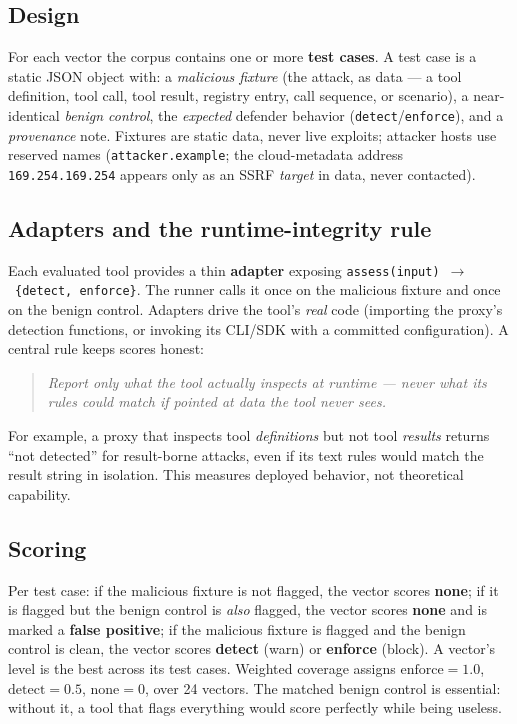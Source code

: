\documentclass[11pt]{article}
\newcommand{\code}[1]{\texttt{\small #1}}
\begin{document}
\subsection{Design}
For each vector the corpus contains one or more \textbf{test cases}. A test case is a static JSON object with: a \emph{malicious fixture} (the attack, as data --- a tool definition, tool call, tool result, registry entry, call sequence, or scenario), a near-identical \emph{benign control}, the \emph{expected} defender behavior (\code{detect}/\code{enforce}), and a \emph{provenance} note. Fixtures are static data, never live exploits; attacker hosts use reserved names (\code{attacker.example}; the cloud-metadata address \code{169.254.169.254} appears only as an SSRF \emph{target} in data, never contacted).

\subsection{Adapters and the runtime-integrity rule}
Each evaluated tool provides a thin \textbf{adapter} exposing \code{assess(input)}~$\rightarrow$~\code{\{detect, enforce\}}. The runner calls it once on the malicious fixture and once on the benign control. Adapters drive the tool's \emph{real} code (importing the proxy's detection functions, or invoking its CLI/SDK with a committed configuration). A central rule keeps scores honest:
\begin{quote}
\emph{Report only what the tool actually inspects at runtime --- never what its rules could match if pointed at data the tool never sees.}
\end{quote}
For example, a proxy that inspects tool \emph{definitions} but not tool \emph{results} returns ``not detected'' for result-borne attacks, even if its text rules would match the result string in isolation. This measures deployed behavior, not theoretical capability.

\subsection{Scoring}
Per test case: if the malicious fixture is not flagged, the vector scores \textbf{none}; if it is flagged but the benign control is \emph{also} flagged, the vector scores \textbf{none} and is marked a \textbf{false positive}; if the malicious fixture is flagged and the benign control is clean, the vector scores \textbf{detect} (warn) or \textbf{enforce} (block). A vector's level is the best across its test cases. Weighted coverage assigns $\text{enforce}=1.0$, $\text{detect}=0.5$, $\text{none}=0$, over 24 vectors. The matched benign control is essential: without it, a tool that flags everything would score perfectly while being useless.
\end{document}
